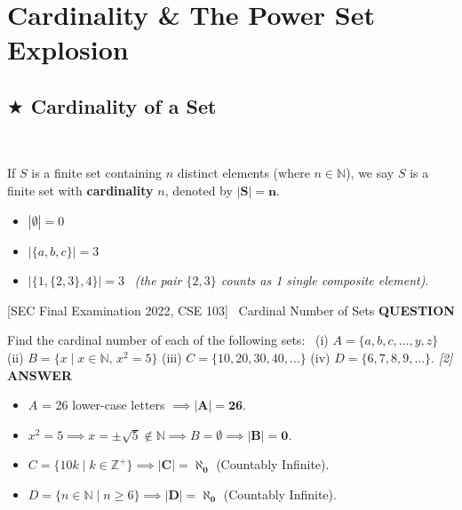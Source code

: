 \documentclass[11pt,a4paper]{article}
\newcommand{\Qlabel}{\textbf{\color{navy}\footnotesize\MakeUppercase{Question}}\par\smallskip}
\newcommand{\Alabel}{\textbf{\color{teal}\footnotesize\MakeUppercase{Answer}}\par\smallskip}
\begin{document}
\section{Cardinality \& The Power Set Explosion}

\subsection{\texorpdfstring{$\bigstar$ }{*}Cardinality of a Set}
\\[3pt]
\begin{defbox}[Cardinality]
If $S$ is a finite set containing $n$ distinct elements (where $n \in \mathbb{N}$), we say $S$ is a finite set with \textbf{cardinality} $n$, denoted by $\mathbf{|S| = n}$.
\begin{itemize}
    \item $|\emptyset| = 0$
    \item $|\{a, b, c\}| = 3$
    \item $|\{1, \{2, 3\}, 4\}| = 3$ \ \textit{(the pair $\{2, 3\}$ counts as 1 single composite element)}.
\end{itemize}
\end{defbox}

\begin{exambox}{[SEC Final Examination 2022, CSE 103] \ Cardinal Number of Sets}
\Qlabel
Find the cardinal number of each of the following sets: \ (i) $A = \{a, b, c, \dots, y, z\}$ \quad (ii) $B = \{x \mid x \in \mathbb{N}, \, x^2 = 5\}$ \quad (iii) $C = \{10, 20, 30, 40, \dots\}$ \quad (iv) $D = \{6, 7, 8, 9, \dots\}$. \hfill\textit{[2]}
\tcblower
\Alabel
\begin{itemize}
    \item $A$ = 26 lower-case letters $\implies \mathbf{|A| = 26}$.
    \item $x^2=5 \implies x=\pm\sqrt5 \notin \mathbb{N} \implies B=\emptyset \implies \mathbf{|B|=0}$.
    \item $C=\{10k \mid k\in\mathbb{Z}^+\} \implies \mathbf{|C| = \aleph_0}$ (Countably Infinite).
    \item $D=\{n\in\mathbb{N}\mid n\ge6\} \implies \mathbf{|D| = \aleph_0}$ (Countably Infinite).
\end{itemize}
\end{exambox}
\end{document}
